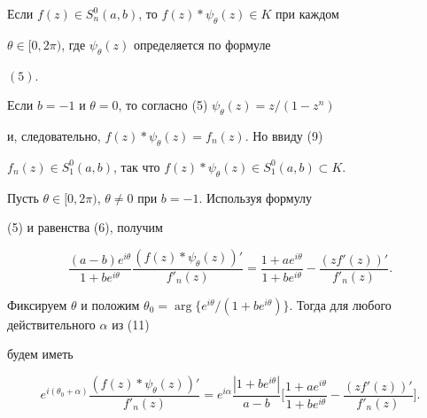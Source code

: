 \begin{lem} 


Если $f(z)\in S^0_n(a,b)$, то $f(z)*\psi_\theta(z)\in K$ при каждом 


$\theta\in[0,2\pi)$, где $\psi_\theta(z)$ определяется по формуле 


$(5)$. 


\end{lem} 


 


\begin{pf} 


Если $b=-1$ и $\theta=0$, то согласно (5)\; $\psi_\theta(z)=z/(1-z^n)$ 


и, следовательно, $f(z)*\psi_\theta(z)=f_n(z)$. Но ввиду (9)\; 


$f_n(z)\in S^0_1(a,b)$, так что $f(z)*\psi_\theta(z)\in 


S^0_1(a,b)\subset K$. 


 


Пусть $\theta\in[0,2\pi)$, $\theta\ne 0$ при $b=-1$. Используя формулу 


(5) и равенства (6), получим 


\begin{equation} 


\frac{(a-b)e^{i\theta}}{1+b e^{i\theta}} 


\frac{(f(z)*\psi_\theta(z))'}{f'_n(z)}= 


\frac{1+a e^{i\theta}}{1+b e^{i\theta}}- 


\frac{(z f'(z))'}{f'_n(z)}.


\end{equation} 


Фиксируем $\theta$ и положим $\theta_0=\arg\{e^{i\theta}/(1+b 


e^{i\theta})\}$. Тогда для любого действительного $\alpha$ из (11) 


будем иметь 


\begin{equation} 


e^{i(\theta_0+\alpha)} 


\frac{(f(z)*\psi_\theta(z))'}{f'_n(z)}=e^{i\alpha} 


\frac{|1+b e^{i\theta}|}{a-b} 


\biggl[\frac{1+a e^{i\theta}}{1+b e^{i\theta}}- 


\frac{(z f'(z))'}{f'_n(z)}\biggr]. 


\end{equation} 



\end{pf}
